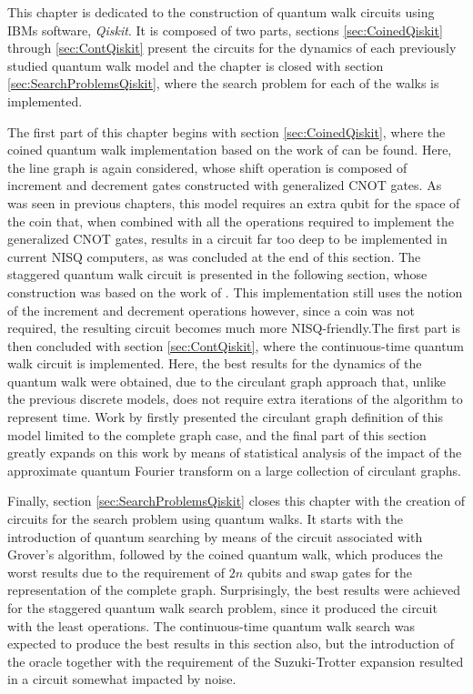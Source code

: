 \documentclass[../../dissertation.tex]{subfiles}
\begin{document}
This chapter is dedicated to the construction of quantum walk circuits using
IBMs software, \textit{Qiskit}. It is composed of two parts, sections
\ref{sec:CoinedQiskit} through \ref{sec:ContQiskit} present the circuits for
the dynamics of each previously studied quantum walk model and the chapter is
closed with section \ref{sec:SearchProblemsQiskit}, where the search problem
for each of the walks is implemented.\par 

The first part of this chapter begins with section \ref{sec:CoinedQiskit},
where the coined quantum walk implementation based on the work of
\cite{douglaswang07} can be found. Here, the line graph is again considered,
whose shift operation is composed of increment and decrement gates constructed
with generalized CNOT gates. As was seen in previous chapters, this model
requires an extra qubit for the space of the coin that, when combined with all
the operations required to implement the generalized CNOT gates, results in a
circuit far too deep to be implemented in current NISQ computers, as was
concluded at the end of this section. The staggered quantum walk circuit is
presented in the following section, whose construction was based on the work of
\cite{acasiete2020}. This implementation still uses the notion of the increment
and decrement operations however, since a coin was not required, the resulting
circuit becomes much more NISQ-friendly.The first part is then concluded with
section \ref{sec:ContQiskit}, where the continuous-time quantum walk circuit is
implemented. Here, the best results for the dynamics of the quantum walk were
obtained, due to the circulant graph approach that, unlike the previous
discrete models, does not require extra iterations of the algorithm to
represent time. Work by \cite{qiang2016} firstly presented the circulant graph
definition of this model limited to the complete graph case, and the final part
of this section greatly expands on this work by means of statistical analysis
of the impact of the approximate quantum Fourier transform on a large
collection of circulant graphs.\par

Finally, section \ref{sec:SearchProblemsQiskit} closes this chapter with the
creation of circuits for the search problem using quantum walks. It starts with
the introduction of quantum searching by means of the circuit associated with
Grover's algorithm, followed by the coined quantum walk, which produces the
worst results due to the requirement of $2n$ qubits and swap gates for the
representation of the complete graph. Surprisingly, the best results were
achieved for the staggered quantum walk search problem, since it produced the
circuit with the least operations. The continuous-time quantum walk search was
expected to produce the best results in this section also, but the introduction
of the oracle together with the requirement of the Suzuki-Trotter expansion
resulted in a circuit somewhat impacted by noise.
\end{document}
